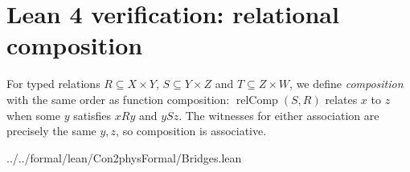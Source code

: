 \section{Lean 4 verification: relational composition}
\label{sec:lean-bridge-04}
For typed relations $R\subseteq X\times Y$, $S\subseteq Y\times Z$
and $T\subseteq Z\times W$, we define \emph{composition} with the
same order as function composition: $\operatorname{relComp}(S,R)$
relates $x$ to $z$ when some $y$ satisfies $xRy$ and $ySz$.
The witnesses for either association are precisely the same $y,z$,
so composition is associative.


{../../formal/lean/Con2physFormal/Bridges.lean}
